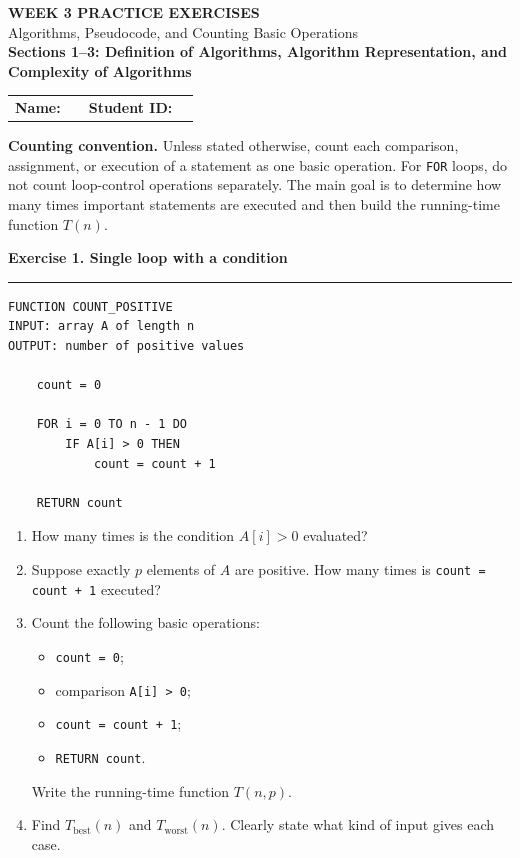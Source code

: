 \documentclass[11pt,a4paper]{article}
\newcommand{\exercise}[1]{%
  \vspace{0.7em}
  {\large\bfseries\color{ForestGreen}#1}
  \vspace{0.2em}
  \hrule
  \vspace{0.5em}
}
\begin{document}
\begin{center}
    {\LARGE\bfseries\color{ForestGreen} WEEK 3 PRACTICE EXERCISES}\\[0.3em]
    {\large Algorithms, Pseudocode, and Counting Basic Operations}\\[0.4em]
    \textbf{Sections 1--3: Definition of Algorithms, Algorithm Representation, and Complexity of Algorithms}
\end{center}

\vspace{0.4em}

\begin{center}
\begin{tabularx}{0.96\textwidth}{>{\bfseries}l X >{\bfseries}l X}
Name: & \hrulefill & Student ID: & \hrulefill
\end{tabularx}
\end{center}

\vspace{0.5em}

\colorbox{SoftGreen}{
\parbox{0.94\textwidth}{
\textbf{Counting convention.}
Unless stated otherwise, count each comparison, assignment, or execution of a statement as one basic operation.
For \texttt{FOR} loops, do not count loop-control operations separately.
The main goal is to determine how many times important statements are executed and then build the running-time function $T(n)$.
}}

\exercise{Exercise 1. Single loop with a condition}

\begin{lstlisting}[style=pseudo]
FUNCTION COUNT_POSITIVE
INPUT: array A of length n
OUTPUT: number of positive values

    count = 0

    FOR i = 0 TO n - 1 DO
        IF A[i] > 0 THEN
            count = count + 1

    RETURN count
\end{lstlisting}

\begin{enumerate}
    \item How many times is the condition $A[i] > 0$ evaluated?

    \item Suppose exactly $p$ elements of $A$ are positive.
    How many times is \texttt{count = count + 1} executed?

    \item Count the following basic operations:
    \begin{itemize}
        \item \texttt{count = 0};
        \item comparison \texttt{A[i] > 0};
        \item \texttt{count = count + 1};
        \item \texttt{RETURN count}.
    \end{itemize}
    Write the running-time function $T(n,p)$.

    \item Find $T_{\mathrm{best}}(n)$ and $T_{\mathrm{worst}}(n)$.
    Clearly state what kind of input gives each case.
\end{enumerate}
\end{document}
